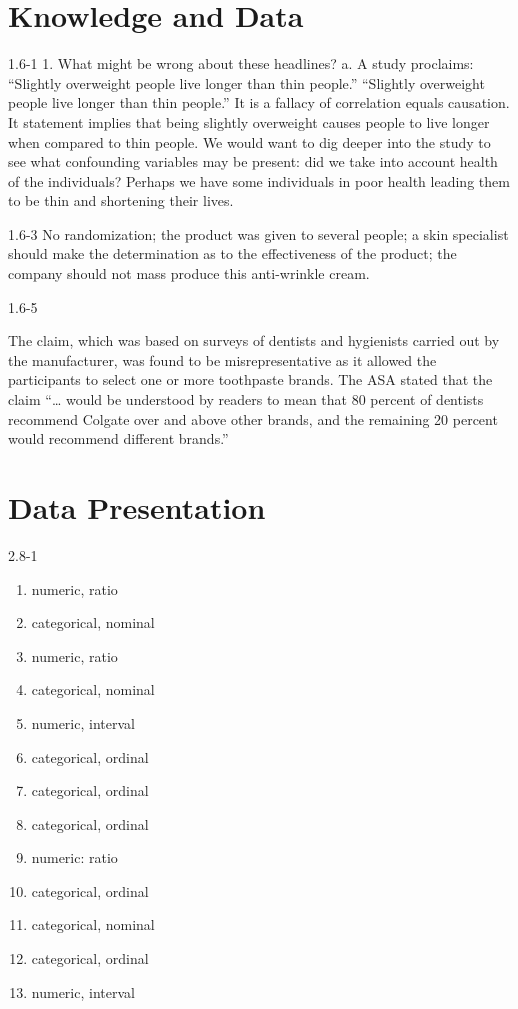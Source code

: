 \setcounter{chapter}{0}\chapter{Knowledge and Data}
\begin{exsol@solution}{1.6-1}
1.  What might be wrong about these headlines?
  a.	A study proclaims: ``Slightly overweight people live longer than thin people.'' ``Slightly overweight people live longer than thin people.''  It is a fallacy of correlation equals causation.  It statement implies that being slightly overweight causes people to live longer when compared to thin people.  We would want to dig deeper into the study to see what confounding variables may be present: did we take into account health of the individuals?  Perhaps we have some individuals in poor health leading them to be thin and shortening their lives.

\end{exsol@solution}
\begin{exsol@solution}{1.6-3}
No randomization; the product was given to several people; a skin specialist should make the determination as to the effectiveness of the product; the company should not mass produce this anti-wrinkle cream.

\end{exsol@solution}
\begin{exsol@solution}{1.6-5}

The claim, which was based on surveys of dentists and hygienists carried out by the manufacturer, was found to be misrepresentative as it allowed the participants to select one or more toothpaste brands. The ASA stated that the claim ``… would be understood by readers to mean that 80 percent of dentists recommend Colgate over and above other brands, and the remaining 20 percent would recommend different brands.''

\end{exsol@solution}
\setcounter{chapter}{1}\chapter{Data Presentation}
\begin{exsol@solution}{2.8-1}
    \begin{enumerate}
	  \item   numeric, ratio
    \item  categorical, nominal
    \item  numeric, ratio
    \item  categorical, nominal
    \item  numeric, interval
    \item  categorical, ordinal
    \item  categorical, ordinal
    \item  categorical, ordinal
    \item  numeric: ratio
    \item  categorical, ordinal
    \item  categorical, nominal
    \item  categorical, ordinal
    \item  numeric, interval
  	\end{enumerate}
\end{exsol@solution}
